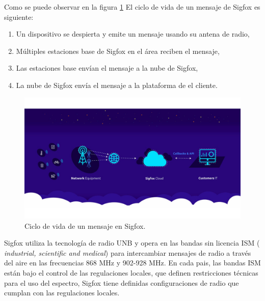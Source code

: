 Como se puede observar en la figura \ref{fig:SigfoxOverview} El ciclo de vida de un mensaje de Sigfox es siguiente:
\begin{enumerate}
    \item Un dispositivo se despierta y emite un mensaje usando su antena de radio,
    \item Múltiples estaciones base de Sigfox en el área reciben el mensaje,
    \item Las estaciones base envían el mensaje a la nube de Sigfox,
    \item La nube de Sigfox envía el mensaje a la plataforma de el cliente.
\end{enumerate}

\begin{figure}[h]
	\centering
	\includegraphics[scale=.25]{./Figures/SigfoxOverview.jpg}
	\caption{Ciclo de vida de un mensaje en Sigfox\protect\footnotemark.}
	\label{fig:SigfoxOverview}
\end{figure}



Sigfox utiliza la tecnología de radio UNB y opera en las bandas sin licencia ISM (\textit{ industrial, scientific and medical}) para intercambiar mensajes de radio a través del aire en las frecuencias 868 MHz y 902-928 MHz. En cada pais, las  bandas ISM están bajo el control de las regulaciones locales, que definen restricciones técnicas para el uso del espectro, Sigfox tiene definidas configuraciones de radio que cumplan con las regulaciones locales.


